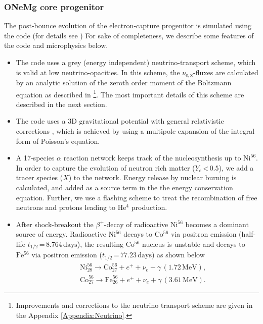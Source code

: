 \documentclass[fleqn,usenatbib]{mnras}
\newcommand{\helium}{$\mathrm{He^{4}}$\xspace}
\newcommand{\nickel}{$\mathrm{Ni^{56}}$\xspace}
\newcommand{\iron}{$\mathrm{Fe^{56}}$\xspace}
\newcommand{\cobalt}{$\mathrm{Co^{56}}$\xspace}
\begin{document}
\subsubsection{ONeMg core progenitor}
The post-bounce evolution of the electron-capture progenitor is simulated using the code (for details see \citealt{Wongwathanarat2012,Wongwathanarat2013}) For sake of completeness, we describe some features of the code and microphysics below.
\begin{itemize}
\item The code uses a grey (energy independent) neutrino-transport scheme, which is valid at low neutrino-opacities. In this scheme, the $\nu_{\mathrm{e,x}}$-fluxes are calculated by an analytic solution of the zeroth order moment of the Boltzmann equation as described in \citet{Scheck2006}\footnote{Improvements and corrections to the neutrino transport scheme \citep{Scheck2006} are given in the Appendix \ref{Appendix:Neutrino}.}. The most important details of this scheme are described in the next section.
\item The code uses a 3D gravitational potential with general relativistic corrections \citep{Marek2006}, which is achieved by using a multipole expansion of the integral form of Poisson's equation.
\item A 17-species $\alpha$ reaction network keeps track of the nucleosynthesis up to $\mathrm{Ni}^{56}$. In order to capture the evolution of neutron rich matter ($Y_e\,\mathord{<}\,0.5$), we add a tracer species ($X$) to the network. Energy release by  nuclear burning is calculated, and added as a source term in the the energy conservation equation. 
Further, we use a flashing scheme to treat the recombination of free neutrons and protons leading to \helium production.
\item After shock-breakout the $\beta^{+}$-decay of radioactive \nickel becomes a dominant source of energy. Radioactive \nickel decays to \cobalt via positron emission (half-life $t_{1/2}\,\mathord{=}\, 8.764\, \mathrm{days}$), the resulting \cobalt nucleus is unstable and decays to \iron via positron emission ($t_{1/2}\,\mathord{=}\, 77.23\, \mathrm{days}$) as shown below 
\begin{eqnarray}
   && \mathrm{Ni}_{28} ^{56} \rightarrow \mathrm{Co}_{27} ^{56} + e^+ + \nu_e + \gamma\, (1.72\,\mathrm{MeV}), \nonumber \\
   && \mathrm{Co}_{27} ^{56} \rightarrow \mathrm{Fe}_{26} ^{56} + e^+ + \nu_e + \gamma\, (3.61\,\mathrm{MeV}).

\end{eqnarray}
\end{itemize}
\end{document}
